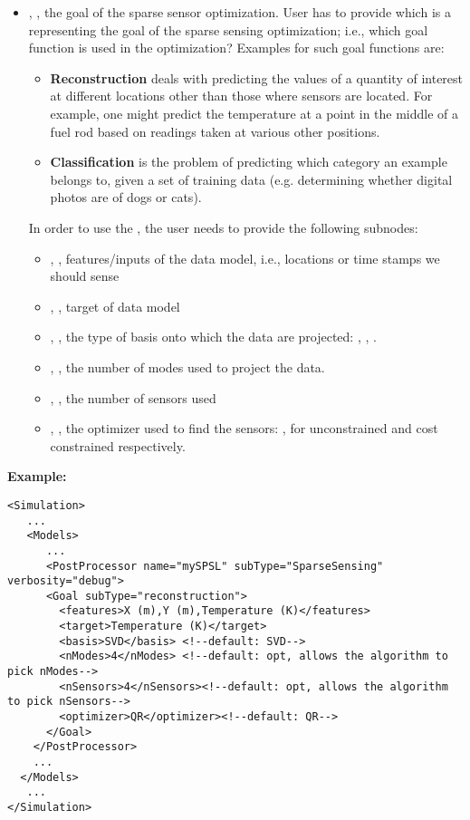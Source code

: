 \begin{itemize}
\item {}, , the goal of the sparse sensor optimization.
User has to provide  which is a  representing the goal of the sparse sensing optimization; i.e., which goal function is used in the optimization? Examples for such goal functions are:
\begin{itemize}
    \item \textbf{Reconstruction} deals with predicting the values of a quantity of interest at different locations other than those where sensors are located. For example, one might predict the temperature at a point in the middle of a fuel rod based on readings taken at various other positions.

    \item \textbf{Classification} is the problem of predicting which category an example belongs to, given a set of training data (e.g. determining whether digital photos are of dogs or cats).
\end{itemize}
In order to use the , the user needs to provide the following subnodes:
\begin{itemize}
	\item {}, , features/inputs of the data model, i.e., locations or time stamps we should sense
	\item {}, , target of data model
	\item {} , , the type of basis onto which the data are projected: , , . 
	\item {},  , the number of modes  used to project the data.
	\item {},  , the number of sensors used
	\item {},  , the optimizer used to find the sensors: ,  for unconstrained and cost constrained respectively.
\end{itemize}
\end{itemize}

\textbf{Example:}
\begin{lstlisting}[style=XML]
<Simulation>
   ...
   <Models>
      ...
      <PostProcessor name="mySPSL" subType="SparseSensing" verbosity="debug">
      <Goal subType="reconstruction">
        <features>X (m),Y (m),Temperature (K)</features>
        <target>Temperature (K)</target>
        <basis>SVD</basis> <!--default: SVD-->
        <nModes>4</nModes> <!--default: opt, allows the algorithm to pick nModes-->
        <nSensors>4</nSensors><!--default: opt, allows the algorithm to pick nSensors-->
        <optimizer>QR</optimizer><!--default: QR-->
      </Goal>
    </PostProcessor>
    ...
  </Models>
   ...
</Simulation>
\end{lstlisting}
